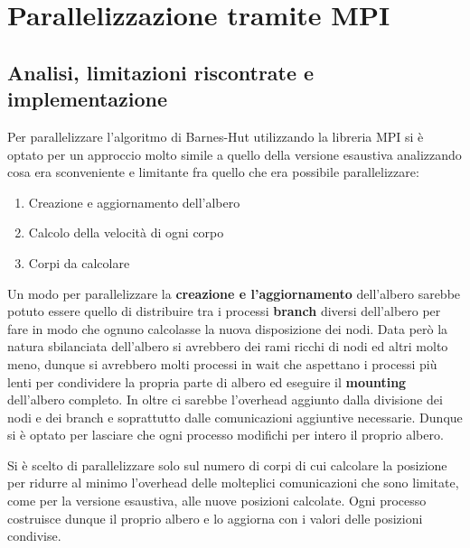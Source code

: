 \documentclass[12pt]{report}
\begin{document}
    \newpage

    \section{Parallelizzazione tramite MPI}
    
    \subsection{Analisi, limitazioni riscontrate e implementazione}
    
    Per parallelizzare l'algoritmo di Barnes-Hut utilizzando la libreria MPI si è optato per un approccio molto simile a quello della versione esaustiva analizzando cosa era sconveniente e limitante fra quello che era possibile parallelizzare:
    \begin{enumerate}
        \item Creazione e aggiornamento dell'albero
        \item Calcolo della velocità di ogni corpo
        \item Corpi da calcolare
    \end{enumerate}

    Un modo per parallelizzare la \textbf{creazione e l'aggiornamento} dell'albero sarebbe potuto essere quello di distribuire tra i processi \textbf{branch} diversi dell'albero per fare in modo che ognuno calcolasse la nuova disposizione dei nodi. Data però la natura sbilanciata dell'albero si avrebbero dei rami ricchi di nodi ed altri molto meno, dunque si avrebbero molti processi in wait che aspettano i processi più lenti per condividere la propria parte di albero ed eseguire il \textbf{mounting} dell'albero completo.
    In oltre ci sarebbe l'overhead aggiunto dalla divisione dei nodi e dei branch e soprattutto dalle comunicazioni aggiuntive necessarie. Dunque si è optato per lasciare che ogni processo modifichi per intero il proprio albero. 
    
    Si è scelto di parallelizzare solo sul numero di corpi di cui calcolare la posizione per ridurre al minimo l'overhead delle molteplici comunicazioni che sono limitate, come per la versione esaustiva, alle nuove posizioni calcolate. Ogni processo costruisce dunque il proprio albero e lo aggiorna con i valori delle posizioni condivise. 
\end{document}
